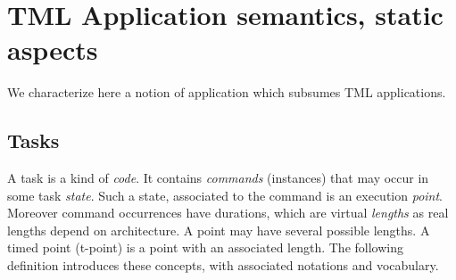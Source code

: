 \documentclass{article}
\begin{document}
\section{TML Application semantics, static aspects}\label{sec-stat}
We characterize here a notion of application which subsumes TML applications.

\subsection{Tasks}
A task is a kind of {\em code}. It contains {\em commands} (instances) that may occur in some task {\em state}. Such a state, associated to the command is an execution {\em point}. Moreover command occurrences have durations, which are virtual {\em lengths} as real lengths depend on architecture. A point may have several possible lengths. A timed point (t-point) is a point with an associated length. The following definition introduces these concepts, with associated notations and vocabulary.
\end{document}
